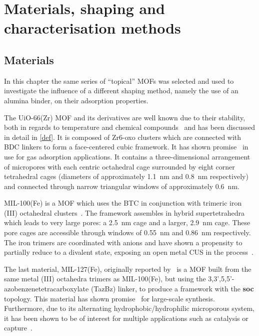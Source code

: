 
\section{Materials, shaping and characterisation methods}

\subsection{Materials}

In this chapter the same series of ``topical'' \glspl{MOF} was selected and
used to investigate the influence of a different shaping method, namely
the use of an alumina binder, on their adsorption properties.

The UiO-66(Zr) \gls{MOF} and its derivatives are well known due to their
stability, both in regards to temperature and chemical
compounds~\cite{cavkaNewZirconiumInorganic2008} and has been
discussed in detail in \autoref{def}. It is composed of
Zr6-oxo clusters which are connected with \gls{BDC} linkers 
to form a face-centered cubic framework. It has
shown promise~\cite{wiersumEvaluationUiO66GasBased2011}
in use for gas adsorption applications. It contains a
three-dimensional arrangement of micropores with each centric
octahedral cage surrounded by eight corner tetrahedral cages
(diameters of approximately \SI{1.1}{\nano\metre} and \SI{0.8}{\nano\metre}
respectively) and connected through narrow triangular windows
of approximately \SI{0.6}{\nano\metre}.

MIL-100(Fe) is a \gls{MOF} which uses the \gls{BTC}
in conjunction with trimeric iron (III) octahedral
clusters~\cite{horcajadaSynthesisCatalyticProperties2007,%
	YangWaterStableMetalOrganic2013}.
The framework assembles in hybrid supertetrahedra which leads to very
large pores: a \SI{2.5}{\nano\metre} cage and a larger, \SI{2.9}{\nano\metre}
cage. These pore cages are accessible through windows of
\SI{0.55}{\nano\metre} and \SI{0.86}{\nano\metre} respectively.
The iron trimers are coordinated with
anions and have shown a propensity to partially reduce to a divalent
 state, exposing an open metal \gls{CUS} in the
process~\cite{yoonControlledReducibilityMetalOrganic2010}.

The last material, MIL-127(Fe), originally reported
by~\citet{liuAssemblyMetalOrganic2007} is a \gls{MOF} built from the same
metal (III) octahedra trimers as MIL-100(Fe), but using the
3,3',5,5'-azobenzenetetracarboxylate (TazBz) linker, to produce a
framework with the \textbf{soc} topology. This material has shown
promise~\cite{chevreauSynthesisBiocompatibleHighly2016}
for large-scale synthesis. Furthermore, due to its alternating
hydrophobic/hydrophilic microporous system, it has been shown to be
of interest for multiple applications such as catalysis or
 capture~\cite{chanutScreeningEffectWater2017}.


